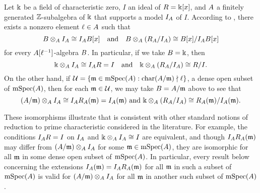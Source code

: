 \documentclass{amsart}
\begin{document}
\begin{remark}
   Let $\Bbbk$ be a field of characteristic zero, $I$ an ideal of $R=\Bbbk[x]$, and $A$ a finitely generated $\mathbb{Z}$-subalgebra of $\Bbbk$ that supports a model $I_A$ of $I$.  
According to , there exists a nonzero element $\ell \in A$ such that 
\[ B \otimes_A I_A  \cong I_A B[x] \quad \text{and} \quad B \otimes_A (R_A / I_A)  \cong B[x]/I_A B[x] \] 
for every $A[\ell^{-1}]$-algebra $B$.  In particular, if we take $B=\Bbbk$, then
\[ \Bbbk \otimes_A I_A  \cong I_A R = I  \quad \text{and} \quad \Bbbk \otimes_A (R_A / I_A)  \cong R/I. \] 
On the other hand, if $\mathcal{U} = \{ \mathfrak{m} \in \operatorname{mSpec}(A) : \operatorname{char}(A/\mathfrak{m}) \nmid \ell \}$,  a dense open subset of $\operatorname{mSpec}(A)$, 
 then for each $\mathfrak{m} \in \mathcal{U}$, we may take $B=A/\mathfrak{m}$ above to see that 
\[ (A/\mathfrak{m}) \otimes_A I_A  \cong I_A R_A(\mathfrak{m}) = I_A(\mathfrak{m})  \text{ and } \Bbbk \otimes_A (R_A / I_A)  \cong R_A(\mathfrak{m}) /I_A(\mathfrak{m}). \] 

These isomorphisms illustrate that   is consistent with other standard notions of reduction to prime characteristic considered in the literature.
For example, the conditions $I_A R = I$ on $I_A$ and $\Bbbk \otimes_A I_A \cong I$ are equivalent, and though $I_A R_A(\mathfrak{m})$  may differ from $(A/\mathfrak{m}) \otimes_A I_A$ for some $\mathfrak{m} \in \operatorname{mSpec}(A)$, they are isomorphic for all $\mathfrak{m}$ in some dense open subset of $\operatorname{mSpec}(A)$.
In particular, every result below concerning the extensions $I_A(\mathfrak{m}) =I_A R_A(\mathfrak{m})$ for all $\mathfrak{m}$ in such a subset of $\operatorname{mSpec}(A)$ is valid for $(A/\mathfrak{m}) \otimes_A I_A$ for all $\mathfrak{m}$ in another such subset of $\operatorname{mSpec}(A)$.
\end{remark}
\end{document}
